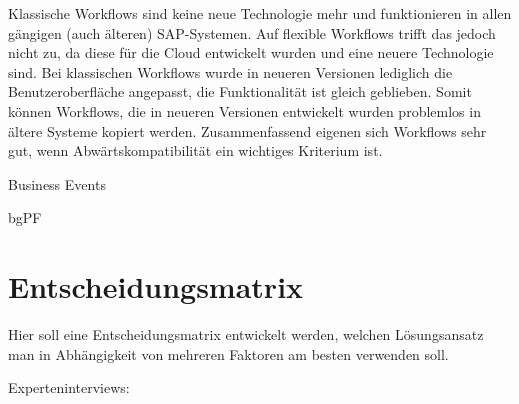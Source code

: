 Klassische Workflows sind keine neue Technologie mehr und funktionieren in allen gängigen (auch älteren) SAP-Systemen. Auf flexible Workflows trifft das jedoch nicht zu, da diese für die Cloud entwickelt wurden und eine neuere Technologie sind. Bei klassischen Workflows wurde in neueren Versionen lediglich die Benutzeroberfläche angepasst, die Funktionalität ist gleich geblieben. Somit können Workflows, die in neueren Versionen entwickelt wurden problemlos in ältere Systeme kopiert werden. Zusammenfassend eigenen sich Workflows sehr gut, wenn Abwärtskompatibilität ein wichtiges Kriterium ist.

Business Events

bgPF

\section{Entscheidungsmatrix}

Hier soll eine Entscheidungsmatrix entwickelt werden, welchen Lösungsansatz man in Abhängigkeit von mehreren Faktoren am besten verwenden soll. \newline

Experteninterviews:



